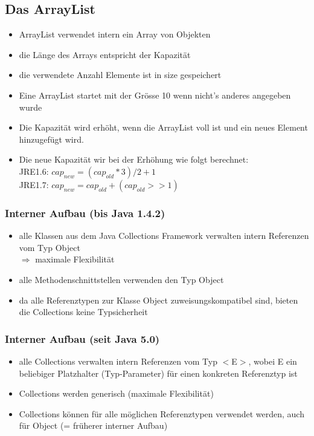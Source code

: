 \documentclass[a4paper,10pt]{article}
\begin{document}
\subsection{Das ArrayList}
\begin{itemize}
	\item ArrayList verwendet intern ein Array von Objekten
	\item die L\"ange des Arrays entspricht der Kapazit\"at
	\item die verwendete Anzahl Elemente ist in size gespeichert
	\item Eine ArrayList startet mit der Gr\"osse 10 wenn nicht's anderes angegeben wurde
	\item Die Kapazit\"at wird erh\"oht, wenn die ArrayList voll ist und ein neues Element hinzugef\"ugt wird.
	\item Die neue Kapazit\"at wir bei der Erh\"ohung wie folgt berechnet:\\
			JRE1.6: $cap_{new}=(cap_{old} * 3) / 2 + 1$\\
			JRE1.7: $cap_{new}=cap_{old} + (cap_{old} >> 1)$
\end{itemize}

\subsubsection{Interner Aufbau (bis Java 1.4.2)}
\begin{itemize}
	\item alle Klassen aus dem Java Collections Framework verwalten intern Referenzen vom Typ Object \\ $\Rightarrow$ maximale Flexibilit\"at
	\item alle Methodenschnittstellen verwenden den Typ Object
	\item da alle Referenztypen zur Klasse Object zuweisungskompatibel sind, bieten die Collections keine Typsicherheit
\end{itemize}

\subsubsection{Interner Aufbau (seit Java 5.0)}
\begin{itemize}
	\item alle Collections verwalten intern Referenzen vom Typ $<$E$>$, wobei E ein beliebiger Platzhalter (Typ-Parameter) f\"ur einen konkreten Referenztyp ist
	\item Collections werden generisch (maximale Flexibilit\"at)
	\item Collections k\"onnen f\"ur alle m\"oglichen Referenztypen verwendet werden, auch
f\"ur Object (= fr\"uherer interner Aufbau)
\end{itemize}
\end{document}
